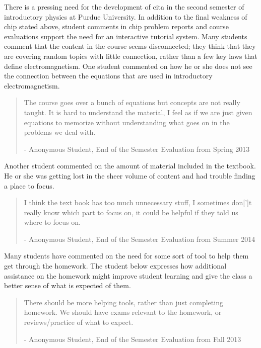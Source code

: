 There is a pressing need for the development of \gls{cita} in the second semester of introductory physics at Purdue University. In addition to the final weakness of \gls{chip} stated above, student comments in \gls{chip} problem reports and course evaluations support the need for an interactive tutorial system. Many students comment that the content in the course seems disconnected; they think that they are covering random topics with little connection, rather than a few key laws that define electromagnetism. One student commented on how he or she does not see the connection between the equations that are used in introductory electromagnetism.

\begin{quote}
The course goes over a bunch of equations but concepts are not really taught. It is hard to understand the material, I feel as if we are just given equations to memorize without understanding what goes on in the problems we deal with.

- Anonymous Student, End of the Semester Evaluation from Spring 2013
\end{quote}

\vspace{4mm}

Another student commented on the amount of material included in the textbook. He or she was getting lost in the sheer volume of content and had trouble finding a place to focus.

\begin{quote}
I think the text book has too much unnecessary stuff, I sometimes don[']t really know which part to focus on, it could be helpful if they told us where to focus on.

- Anonymous Student, End of the Semester Evaluation from Summer 2014
\end{quote}

\vspace{4mm}

Many students have commented on the need for some sort of tool to help them get through the homework. The student below expresses how additional assistance on the homework might improve student learning and give the class a better sense of what is expected of them.

\begin{quote}
There should be more helping tools, rather than just completing homework. We should have exams relevant to the homework, or reviews/practice of what to expect.

- Anonymous Student, End of the Semester Evaluation from Fall 2013
\end{quote}

